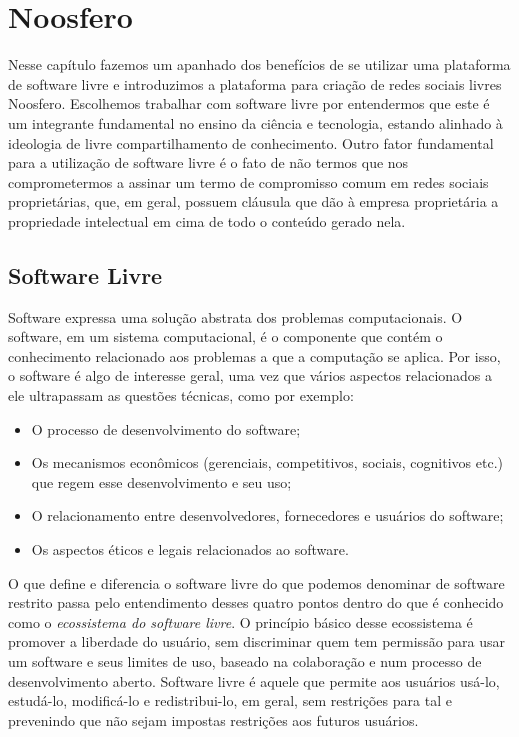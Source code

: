 \chapter{Noosfero}

Nesse capítulo fazemos um apanhado dos benefícios de se utilizar uma
plataforma de software livre e introduzimos a plataforma para criação de
redes sociais livres Noosfero. Escolhemos trabalhar com software livre por
entendermos que este é um integrante fundamental no ensino da ciência e 
tecnologia, estando alinhado à ideologia de livre compartilhamento de
conhecimento. Outro fator fundamental para a utilização de software livre é o
fato de não termos que nos comprometermos a assinar um termo de compromisso
comum em redes sociais proprietárias, que, em geral, possuem cláusula que dão à
empresa proprietária a propriedade intelectual em cima de todo o conteúdo
gerado nela.


\section{Software Livre}

Software expressa uma solução abstrata dos problemas computacionais.
%
O software, em um sistema computacional, é o componente que contém o
conhecimento relacionado aos problemas a que a computação se aplica.
%
Por isso, o software é algo de interesse geral, uma vez que vários aspectos
relacionados a ele ultrapassam as questões técnicas, como por exemplo:
\begin{itemize}
\item O processo de desenvolvimento do software; 
\item Os mecanismos econômicos (gerenciais, competitivos, sociais, cognitivos etc.)
que regem esse desenvolvimento e seu uso;
\item O relacionamento entre desenvolvedores, fornecedores e usuários do
        software;
\item Os aspectos éticos e legais relacionados ao software.
\end{itemize}

O que define e diferencia o software livre do que podemos denominar de
software restrito passa pelo entendimento desses quatro pontos dentro do que é
conhecido como o \emph{ecossistema do software livre}.
%
O princípio básico desse ecossistema é promover a liberdade do usuário,
sem discriminar quem tem permissão para usar um software e seus limites de uso,
baseado na colaboração e num processo de desenvolvimento aberto.
%
Software livre é aquele que permite aos usuários usá-lo, estudá-lo, modificá-lo e
redistribui-lo, em geral, sem restrições para tal e prevenindo que não sejam
impostas restrições aos futuros usuários.
%

